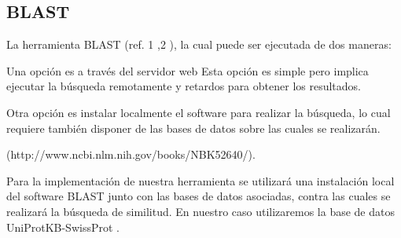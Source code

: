 \subsection{BLAST}\label{blast}

La herramienta BLAST (ref. 1 ,2 ), la cual puede ser ejecutada de dos maneras:

Una opción es a través del servidor web \cite{blastWeb}
    Esta opción es simple pero implica ejecutar la búsqueda remotamente y retardos para obtener los resultados. 
 
Otra opción es instalar localmente el software para realizar la búsqueda, lo cual requiere también disponer de las bases de datos sobre las cuales se realizarán.
    
    (http://www.ncbi.nlm.nih.gov/books/NBK52640/).


Para la implementación de nuestra herramienta se utilizará una instalación local del software BLAST junto con las bases de datos asociadas, contra las cuales se realizará la búsqueda de similitud. 
En nuestro caso utilizaremos la base de datos UniProtKB-SwissProt \cite{bairoch2000swiss}.



